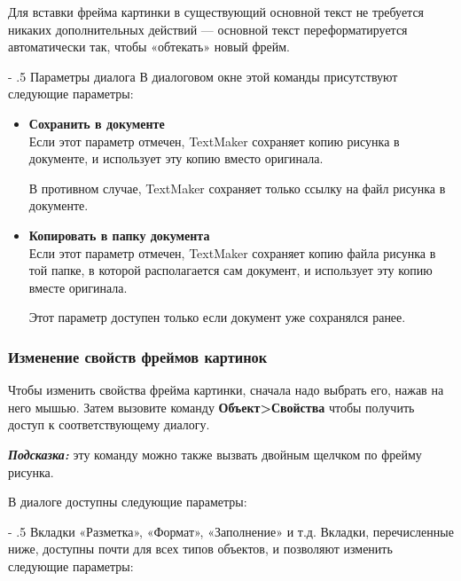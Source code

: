 \documentclass[a4paper,10pt]{article}
\makeatletter
\renewcommand\paragraph{%
   \@startsection{paragraph}{4}{0mm}%
      {-\baselineskip}%
      {.5\baselineskip}%
      {\normalfont\normalsize\bfseries}}
\makeatother
\begin{document}
Для вставки фрейма картинки в существующий основной текст не требуется никаких дополнительных действий — основной текст переформатируется автоматически так, чтобы «обтекать» новый фрейм.

\paragraph{Параметры диалога}
В диалоговом окне этой команды присутствуют следующие параметры:
\begin{itemize}
 \item \textbf{Сохранить в документе}\\
 Если этот параметр отмечен, TextMaker сохраняет копию рисунка в документе, и использует эту копию вместо оригинала.
 
В противном случае, TextMaker сохраняет только ссылку на файл рисунка в документе.
\item \textbf{Копировать в папку документа}\\
Если этот параметр отмечен, TextMaker сохраняет копию файла рисунка в той папке, в которой располагается сам документ, и использует эту копию вместе оригинала.

Этот параметр доступен только если документ уже сохранялся ранее.
\end{itemize}

\subsubsection{Изменение свойств фреймов картинок}
Чтобы изменить свойства фрейма картинки, сначала надо выбрать его, нажав на него мышью. Затем вызовите команду \textbf{Объект>Свойства} чтобы получить доступ к соответствующему диалогу.

\begin{mdframed}[backgroundcolor=blue!10]
\textbf{\textit{Подсказка:}} эту команду можно также вызвать двойным щелчком по фрейму рисунка.
\end{mdframed}

В диалоге доступны следующие параметры:

\paragraph{Вкладки «Разметка», «Формат», «Заполнение» и т.д.}
Вкладки, перечисленные ниже, доступны почти для всех типов объектов, и позволяют изменить следующие
параметры:
\end{document}
